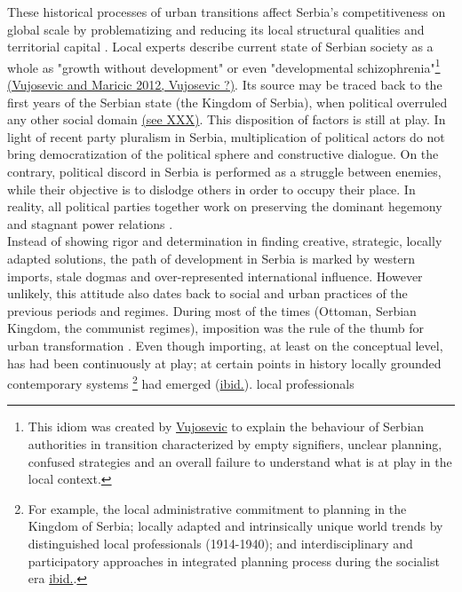 \documentclass[11pt]{report}
\begin{document}
These historical processes of urban transitions affect Serbia's competitiveness on global scale by problematizing and reducing its local structural qualities and territorial capital \href{ref}{\citealt{vujosevic_conundrum_2012}}. Local experts describe current state of Serbian society as a whole as "growth without development" or even "developmental schizophrenia"\footnote{This idiom was created by \href{ref}{Vujosevic} to explain the behaviour of Serbian authorities in transition characterized by empty signifiers, unclear planning, confused strategies and an overall failure to understand what is at play in the local context.} \href{ref}{(Vujosevic and Maricic 2012, Vujosevic ?)}.
Its source may be traced back to the first years of the Serbian state (the Kingdom of Serbia), when political overruled any other social domain \href{ref}{(see XXX)}. This disposition of factors is still at play. In light of recent party pluralism in Serbia, multiplication of political actors do not bring democratization of the political sphere and constructive dialogue. On the contrary, political discord in Serbia is performed as a struggle between enemies, while their objective is to dislodge others in order to occupy their place. In reality, all political parties together work on preserving the dominant hegemony and stagnant power relations \href{ref}{\citealt{mouffe_which_2002}}.
\\
Instead of showing rigor and determination in finding creative, strategic, locally adapted solutions, the path of development in Serbia is marked by western imports, stale dogmas and over-represented international influence. However unlikely, this attitude also dates back to social and urban practices of the previous periods and regimes. During most of the times (Ottoman, Serbian Kingdom, the communist regimes), imposition was the rule of the thumb for urban transformation \href{ref}{\citealt{nedovicbudic_waves_2006}}. Even though importing, at least on the conceptual level, has had been continuously at play; at certain points in history locally grounded contemporary systems
\footnote{For example, the local administrative commitment to planning in the Kingdom of Serbia; locally adapted and intrinsically unique world trends by distinguished local professionals (1914-1940); and interdisciplinary and participatory approaches in integrated planning process during the socialist era \href{ref}{ibid.}.} had emerged (\href{Nedovic}{ibid.}).
local professionals  
\\
\end{document}
